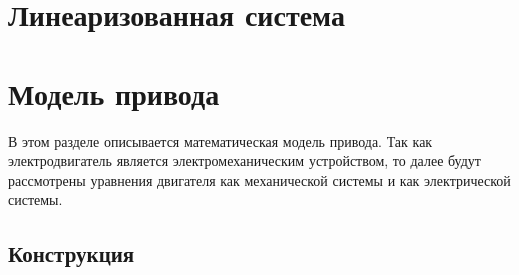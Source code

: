 \section{Линеаризованная система} \label{ch:ch3/sect10}

\section{Модель привода} \label{ch:ch3/sect9}

В этом разделе описывается математическая модель привода. Так как электродвигатель является электромеханическим устройством, то далее будут рассмотрены уравнения двигателя как механической системы и как электрической системы.

\subsection{Конструкция} \label{sec:ch3/sec9/sub1}

